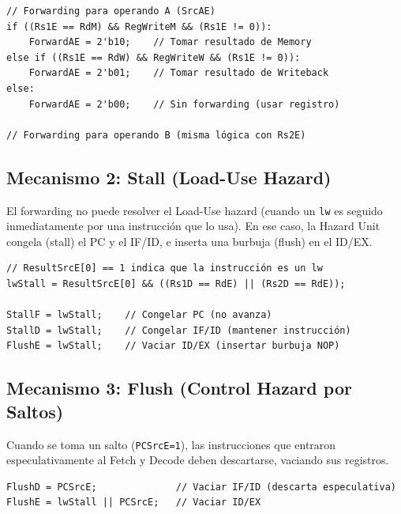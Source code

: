 \documentclass[12pt, a4paper]{article}
\begin{document}
\begin{lstlisting}[style=pseudo, caption={Lógica de Forwarding}]
// Forwarding para operando A (SrcAE)
if ((Rs1E == RdM) && RegWriteM && (Rs1E != 0)):
    ForwardAE = 2'b10;    // Tomar resultado de Memory
else if ((Rs1E == RdW) && RegWriteW && (Rs1E != 0)):
    ForwardAE = 2'b01;    // Tomar resultado de Writeback
else:
    ForwardAE = 2'b00;    // Sin forwarding (usar registro)

// Forwarding para operando B (misma lógica con Rs2E)
\end{lstlisting}

\subsection{Mecanismo 2: Stall (Load-Use Hazard)}
El forwarding no puede resolver el Load-Use hazard (cuando un \texttt{lw} es seguido inmediatamente por una instrucción que lo usa). En ese caso, la Hazard Unit congela (stall) el PC y el IF/ID, e inserta una burbuja (flush) en el ID/EX.

\begin{lstlisting}[style=pseudo, caption={Lógica de detección de Load-Use Hazard}]
// ResultSrcE[0] == 1 indica que la instrucción es un lw
lwStall = ResultSrcE[0] && ((Rs1D == RdE) || (Rs2D == RdE));

StallF = lwStall;    // Congelar PC (no avanza)
StallD = lwStall;    // Congelar IF/ID (mantener instrucción)
FlushE = lwStall;    // Vaciar ID/EX (insertar burbuja NOP)
\end{lstlisting}

\subsection{Mecanismo 3: Flush (Control Hazard por Saltos)}
Cuando se toma un salto (\texttt{PCSrcE=1}), las instrucciones que entraron especulativamente al Fetch y Decode deben descartarse, vaciando sus registros.

\begin{lstlisting}[style=pseudo, caption={Lógica de flush por salto tomado}]
FlushD = PCSrcE;              // Vaciar IF/ID (descarta especulativa)
FlushE = lwStall || PCSrcE;   // Vaciar ID/EX
\end{lstlisting}
\end{document}
